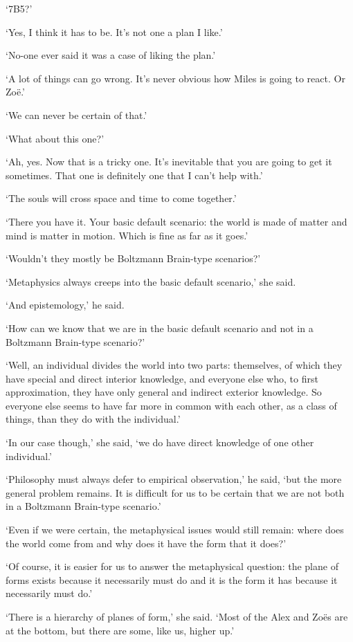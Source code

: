 `7B5?'

`Yes, I think it has to be. It's not one a plan I like.'

`No-one ever said it was a case of liking the plan.'

`A lot of things can go wrong. It's never obvious how Miles is going to react. Or Zo{\"e}.'

`We can never be certain of that.'

`What about this one?'

`Ah, yes. Now that is a tricky one. It's inevitable that you are going to get it sometimes. That one is definitely one that I can't help with.'

`The souls will cross space and time to come together.'

`There you have it. Your basic default scenario: the world is made of matter and mind is matter in motion. Which is fine as far as it goes.'

`Wouldn't they mostly be Boltzmann Brain-type scenarios?'

`Metaphysics always creeps into the basic default scenario,' she said.

`And epistemology,' he said.

`How can we know that we are in the basic default scenario and not in a Boltzmann Brain-type scenario?'

`Well, an individual divides the world into two parts: themselves, of which they have special and direct interior knowledge, and everyone else who, to first approximation, they have only general and indirect exterior knowledge. So everyone else seems to have far more in common with each other, as a class of things, than they do with the individual.'

`In our case though,' she said, `we do have direct knowledge of one other individual.'

`Philosophy must always defer to empirical observation,' he said, `but the more general problem remains. It is difficult for us to be certain that we are not both in a Boltzmann Brain-type scenario.'

`Even if we were certain, the metaphysical issues would still remain: where does the world come from and why does it have the form that it does?'

`Of course, it is easier for us to answer the metaphysical question: the plane of forms exists because it necessarily must do and it is the form it has because it necessarily must do.'

`There is a hierarchy of planes of form,' she said. `Most of the Alex and Zo{\"e}s are at the bottom, but there are some, like us, higher up.'

